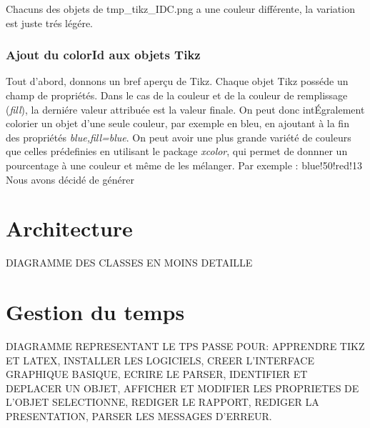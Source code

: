 \documentclass[a4paper]{report}
\begin{document}
Chacuns des objets de tmp\_tikz\_IDC.png a une couleur différente, la variation est juste trés légére.

\subsubsection{Ajout du colorId aux objets Tikz}
Tout d'abord, donnons un bref aperçu de Tikz.
Chaque objet Tikz posséde un champ de propriétés. Dans le cas de la couleur et de la couleur de  remplissage (\textit{fill}), la derniére valeur attribuée est la valeur finale.
On peut donc intÉgralement colorier un objet d'une seule couleur, par exemple en bleu, en ajoutant à la fin des propriétés \textit{blue,fill=blue}.
On peut avoir une plus grande variété de couleurs que celles prédefinies en utilisant le package \textit{xcolor}, qui permet de donnner un pourcentage à une couleur et même de les mélanger. Par exemple : blue!50!red!13
Nous avons décidé de générer 
\section{Architecture}
  DIAGRAMME DES CLASSES EN MOINS DETAILLE   
\section{Gestion du temps}
  DIAGRAMME REPRESENTANT LE TPS PASSE POUR: APPRENDRE TIKZ ET LATEX, INSTALLER LES LOGICIELS, CREER L'INTERFACE GRAPHIQUE BASIQUE, ECRIRE LE PARSER, IDENTIFIER ET DEPLACER UN OBJET, AFFICHER ET MODIFIER LES PROPRIETES DE L'OBJET SELECTIONNE, REDIGER LE RAPPORT, REDIGER LA PRESENTATION, PARSER LES MESSAGES D'ERREUR.
\end{document}
